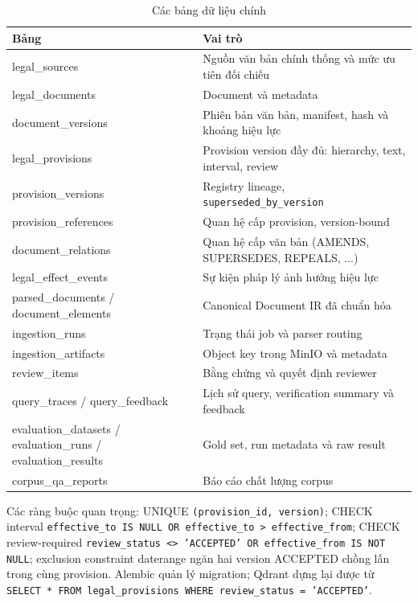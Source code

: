 \documentclass[a4paper,12pt]{extreport}
\newcommand{\code}[1]{\texttt{#1}}
\begin{document}
\begin{table}[H]
\caption{Các bảng dữ liệu chính}
\begin{tabularx}{\textwidth}{p{4.5cm}X}
\toprule
\textbf{Bảng} & \textbf{Vai trò}\\
\midrule
legal\_sources & Nguồn văn bản chính thống và mức ưu tiên đối chiếu\\
legal\_documents & Document và metadata\\
document\_versions & Phiên bản văn bản, manifest, hash và khoảng hiệu lực\\
legal\_provisions & Provision version đầy đủ: hierarchy, text, interval, review\\
provision\_versions & Registry lineage, \code{superseded\_by\_version}\\
provision\_references & Quan hệ cấp provision, version-bound\\
document\_relations & Quan hệ cấp văn bản (AMENDS, SUPERSEDES, REPEALS, ...)\\
legal\_effect\_events & Sự kiện pháp lý ảnh hưởng hiệu lực\\
parsed\_documents / document\_elements & Canonical Document IR đã chuẩn hóa\\
ingestion\_runs & Trạng thái job và parser routing\\
ingestion\_artifacts & Object key trong MinIO và metadata\\
review\_items & Bằng chứng và quyết định reviewer\\
query\_traces / query\_feedback & Lịch sử query, verification summary và feedback\\
evaluation\_datasets / evaluation\_runs / evaluation\_results & Gold set, run metadata và raw result\\
corpus\_qa\_reports & Báo cáo chất lượng corpus\\
\bottomrule
\end{tabularx}
\end{table}

\begin{sloppypar}
Các ràng buộc quan trọng: UNIQUE \code{(provision\_id, version)}; CHECK interval \code{effective\_to IS NULL OR effective\_to > effective\_from}; CHECK review-required \code{review\_status <> 'ACCEPTED' OR effective\_from IS NOT NULL}; exclusion constraint daterange ngăn hai version ACCEPTED chồng lấn trong cùng provision. Alembic quản lý migration; Qdrant dựng lại được từ \code{SELECT * FROM legal\_provisions WHERE review\_status = 'ACCEPTED'}.
\end{sloppypar}
\end{document}
